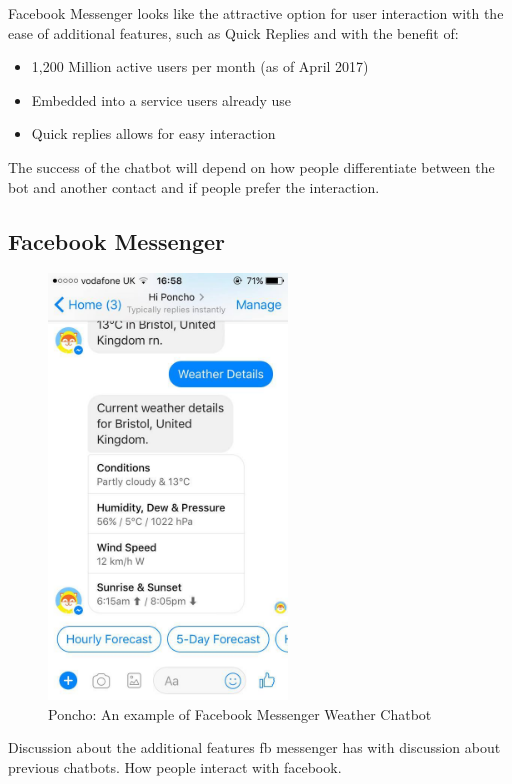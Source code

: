 Facebook Messenger looks like the attractive option for user interaction with the ease of additional features, such as Quick Replies and with the benefit of:

\begin{itemize}
  \item 1,200 Million active users per month (as of April 2017)~\cite{fb_messenger_stats}
  \item Embedded into a service users already use
  \item Quick replies allows for easy interaction
\end{itemize}

The success of the chatbot will depend on how people differentiate between the bot and another contact and if people prefer the interaction.

\subsection*{Facebook Messenger}

\begin{figure}[H] %
    \centering
    \includegraphics[width=2.5in]{../resources/existing-bots/poncho.jpg}
    \caption{Poncho: An example of Facebook Messenger Weather Chatbot}
    \label{fig:poncho}
\end{figure}

Discussion about the additional features fb messenger has with discussion about previous chatbots.\newline
How people interact with facebook.



